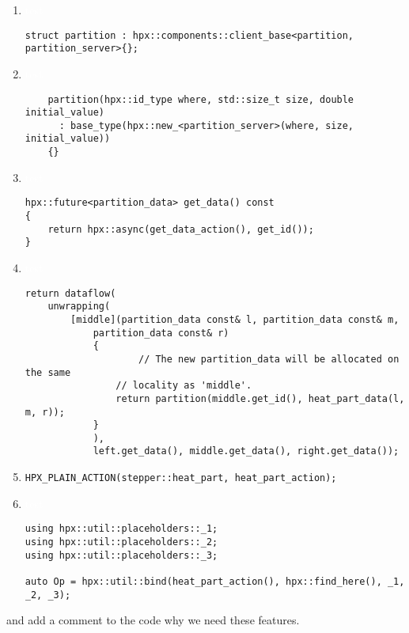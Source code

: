 \documentclass[11pt]{article}
\begin{document}
\begin{enumerate}
\begin{enumerate}
\item \textcolor{white}{test} 
\begin{lstlisting}
struct partition : hpx::components::client_base<partition, partition_server>{};
\end{lstlisting}

\item \textcolor{white}{test} 
\begin{lstlisting}
    partition(hpx::id_type where, std::size_t size, double initial_value)
      : base_type(hpx::new_<partition_server>(where, size, initial_value))
    {}
\end{lstlisting}

\item \textcolor{white}{test} 
\begin{lstlisting}
hpx::future<partition_data> get_data() const
{
	return hpx::async(get_data_action(), get_id());
}
\end{lstlisting}

\item \textcolor{white}{test} 
\begin{lstlisting}
return dataflow(
	unwrapping(
		[middle](partition_data const& l, partition_data const& m,
			partition_data const& r)
            {
            		// The new partition_data will be allocated on the same
                // locality as 'middle'.
                return partition(middle.get_id(), heat_part_data(l, m, r));
            }
            ),
            left.get_data(), middle.get_data(), right.get_data());
\end{lstlisting}

\item \lstinline|HPX_PLAIN_ACTION(stepper::heat_part, heat_part_action);|

\item \textcolor{white}{test} 
\begin{lstlisting}
using hpx::util::placeholders::_1;
using hpx::util::placeholders::_2;
using hpx::util::placeholders::_3;

auto Op = hpx::util::bind(heat_part_action(), hpx::find_here(), _1, _2, _3);
\end{lstlisting}

\end{enumerate}

\end{enumerate}
and add a comment to the code why we need these features.

\doclicenseThis 
\end{document}
